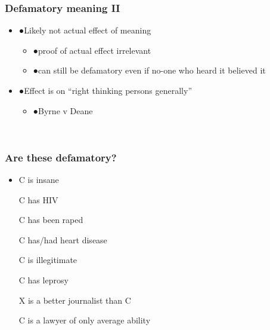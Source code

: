 \documentclass[ignorenonframetext,]{beamer}
\begin{document}
\begin{frame}
\frametitle{Defamatory meaning II}

\begin{itemize}
\item  {●}{Likely} not {actual} effect of meaning

  \begin{itemize}
  \item    {●}proof of actual effect irrelevant
  \item    {●}can still be defamatory even if no-one who heard it believed
    it
  \end{itemize}
\item  {●}Effect is on ``right thinking persons generally''

  \begin{itemize}
  \item    {●}Byrne v Deane
  \end{itemize}
\end{itemize}

~


\end{frame}

\begin{frame}
\frametitle{Are these defamatory?}

\begin{itemize}
\item  C is insane

  C has HIV

  C has been raped

  C has/had heart disease

  C is illegitimate

  C has leprosy

  X is a better journalist than C

  C is a lawyer of only average ability
\end{itemize}

~


\end{frame}
\end{document}
